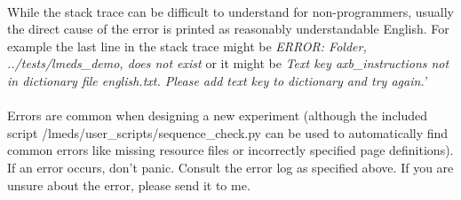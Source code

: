 \begin{tcolorbox}[breakable,colback=white,colframe=red,width=\dimexpr\textwidth+12mm\relax,enlarge left by=-6mm]
\paragraph{}
While the stack trace can be difficult to understand for non-programmers, usually the direct cause of the error is printed as reasonably understandable English.  For example the last line in the stack trace might be \textit{ERROR: Folder, ../tests/lmeds\_demo, does not exist} or it might be \textit{Text key axb\_instructions not in dictionary file english.txt.  Please add text key to dictionary and try again.'}

\paragraph{}
Errors are common when designing a new experiment (although the included script /lmeds/user\_scripts/sequence\_check.py can be used to automatically find common errors like missing resource files or incorrectly specified page definitions).  If an error occurs, don't panic.  Consult the error log as specified above.  If you are unsure about the error, please send it to me.

\end{tcolorbox}



